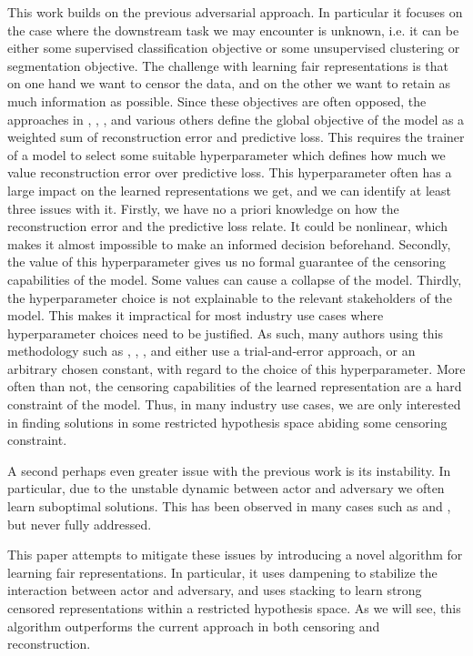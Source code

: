\documentclass[nohyperref]{article}
\theoremstyle{plain}
\theoremstyle{definition}
\theoremstyle{remark}
\begin{document}
This work builds on the previous adversarial approach. In particular it focuses on the case where the downstream task we may encounter is unknown, i.e. it can be either some supervised classification objective or some unsupervised clustering or segmentation objective. The challenge with learning fair representations is that on one hand we want to censor the data, and on the other we want to retain as much information as possible. Since these objectives are often opposed, the approaches in \cite{edwards2016censoring}, \cite{pmlr-v80-madras18a}, \cite{kenfack2021adversarial}, and various others define the global objective of the model as a weighted sum of reconstruction error and predictive loss. This requires the trainer of a model to select some suitable hyperparameter which defines how much we value reconstruction error over predictive loss. This hyperparameter often has a large impact on the learned representations we get, and we can identify at least three issues with it. Firstly, we have no a priori knowledge on how the reconstruction error and the predictive loss relate. It could be nonlinear, which makes it almost impossible to make an informed decision beforehand. Secondly, the value of this hyperparameter gives us no formal guarantee of the censoring capabilities of the model. Some values can cause a collapse of the model. Thirdly, the hyperparameter choice is not explainable to the relevant stakeholders of the model. This makes it impractical for most industry use cases where hyperparameter choices need to be justified. As such, many authors using this methodology such as \cite{edwards2016censoring}, \cite{pmlr-v80-madras18a}, \cite{Feng2019LearningFR}, and \cite{kenfack2021adversarial} either use a trial-and-error approach, or an arbitrary chosen constant, with regard to the choice of this hyperparameter. More often than not, the censoring capabilities of the learned representation are a hard constraint of the model. Thus, in many industry use cases, we are only interested in finding solutions in some restricted hypothesis space abiding some censoring constraint.

A second perhaps even greater issue with the previous work is its instability. In particular, due to the unstable dynamic between actor and adversary we often learn suboptimal solutions. This has been observed in many cases such as \cite{edwards2016censoring} and \cite{kenfack2021adversarial}, but never fully addressed.

This paper attempts to mitigate these issues by introducing a novel algorithm for learning fair representations. In particular, it uses dampening to stabilize the interaction between actor and adversary, and uses stacking to learn strong censored representations within a restricted hypothesis space. As we will see, this algorithm outperforms the current approach in both censoring and reconstruction.
\end{document}

